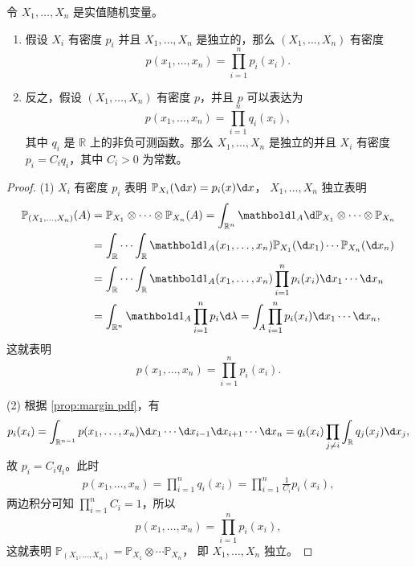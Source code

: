 \documentclass[fontset=none]{Notes}
\newcommand{\indicator}[1]{\mathbold 1_{#1}}
\begin{document}
\begin{corollary}\label{coro:independence by pdf}
  令 $X_1,\dots,X_n$ 是实值随机变量。
  \begin{enumerate}
    \item 假设 $X_i$ 有密度 $p_i$ 并且 $X_1,\dots,X_n$ 是独立的，那么
    $(X_1,\dots,X_n)$ 有密度
    \[
      p(x_1,\dots,x_n)=\prod_{i=1}^n p_i(x_i).  
    \]
    \item 反之，假设 $(X_1,\dots,X_n)$ 有密度 $p$，并且
    $p$ 可以表达为
    \[
    p(x_1,\dots,x_n)=\prod_{i=1}^n q_i(x_i),  
    \]
    其中 $q_i$ 是 $\mathbb{R}$ 上的非负可测函数。那么 $X_1,\dots,X_n$
    是独立的并且 $X_i$ 有密度 $p_i=C_iq_i$，其中 $C_i>0$ 为常数。
  \end{enumerate}
\end{corollary}
\begin{proof}
  (1) $X_i$ 有密度 $p_i$ 表明 $\mathbb{P}_{X_i}(\d x)=p_i(x)\d x$，
  $X_1,\dots,X_n$ 独立表明
  \begin{align*}
    \mathbb{P}_{(X_1,\dots,X_n)}(A)&=
    \mathbb{P}_{X_1}\otimes\cdots\otimes \mathbb{P}_{X_n}(A)
    =\int_{\mathbb{R}^n} \indicator{A} \d \mathbb{P}_{X_1}\otimes\cdots\otimes \mathbb{P}_{X_n}
    \\
    &=\int_{\mathbb{R}}\cdots \int_{\mathbb{R}}\indicator{A}(x_1,\dots,x_n)
    \mathbb{P}_{X_1}(\d x_1)\cdots \mathbb{P}_{X_n}(\d x_n) \\
    &=\int_{\mathbb{R}}\cdots \int_{\mathbb{R}}\indicator{A}(x_1,\dots,x_n)
    \prod_{i=1}^n p_i(x_i)
    \d x_1\cdots \d x_n\\
    &=\int_{\mathbb{R}^n} \indicator{A}\prod_{i=1}^n p_i \d \lambda
    =\int_A \prod_{i=1}^np_i(x_i) \d x_1\cdots\d x_n,
  \end{align*}
  这就表明 
  \[
    p(x_1,\dots,x_n)=\prod_{i=1}^n p_i(x_i).  
  \]

  (2) 根据 \autoref{prop:margin pdf}，有
  \[
    p_i(x_i)=\int_{\mathbb{R}^{n-1}}p(x_1,\dots,x_n)\d x_1\cdots \d x_{i-1}
    \d x_{i+1}\cdots\d x_n
    =q_i(x_i)\prod_{j\neq i}\int_{\mathbb{R}}q_j(x_j)\d x_j,
  \]
  故 $p_i=C_iq_i$。此时
  \begin{align*}
    p(x_1,\dots,x_n)=\prod_{i=1}^n q_i(x_i)
    =\prod_{i=1}^n \frac{1}{C_i}p_i(x_i),
  \end{align*}
  两边积分可知 $\prod_{i=1}^n C_i=1$，所以
  \[
    p(x_1,\dots,x_n)=\prod_{i=1}^n p_i(x_i),  
  \]
  这就表明 $\mathbb{P}_{(X_1,\dots,X_n)}=\mathbb{P}_{X_1}\otimes\cdots \mathbb{P}_{X_n}$，
  即 $X_1,\dots,X_n$ 独立。
\end{proof} 
\end{document}
